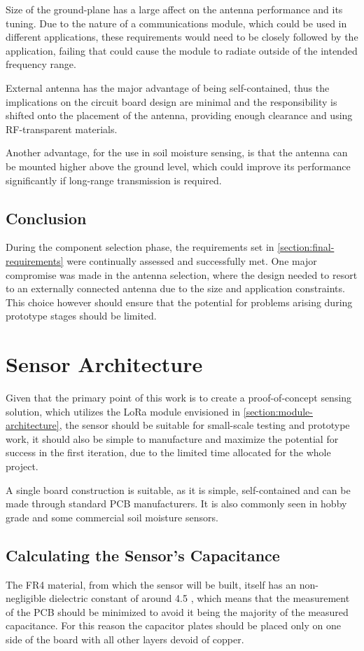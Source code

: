 Size of the ground-plane has a large affect on the antenna performance and its tuning. Due to the nature of a communications module, which could be used in different applications, these requirements would need to be closely followed by the application, failing that could cause the module to radiate outside of the intended frequency range.

External antenna has the major advantage of being self-contained, thus the implications on the circuit board design are minimal and the responsibility is shifted onto the placement of the antenna, providing enough clearance and using RF-transparent materials.

Another advantage, for the use in soil moisture sensing, is that the antenna can be mounted higher above the ground level, which could improve its performance significantly if long-range transmission is required.

\subsection{Conclusion}
During the component selection phase, the requirements set in \ref{section:final-requirements} were continually assessed and successfully met. One major compromise was made in the antenna selection, where the design needed to resort to an externally connected antenna due to the size and application constraints. This choice however should ensure that the potential for problems arising during prototype stages should be limited.

\FloatBarrier
\section{Sensor Architecture}
Given that the primary point of this work is to create a proof-of-concept sensing solution, which utilizes the LoRa module envisioned in \ref{section:module-architecture}, the sensor should be suitable for small-scale testing and prototype work, it should also be simple to manufacture and maximize the potential for success in the first iteration, due to the limited time allocated for the whole project.

A single board construction is suitable, as it is simple, self-contained and can be made through standard PCB manufacturers. It is also commonly seen in hobby grade and some commercial soil moisture sensors.

\subsection{\label{section:expected-cap}Calculating the Sensor's Capacitance}
The FR4 material, from which the sensor will be built, itself has an non-negligible dielectric constant of around 4.5 \cite{pcbway_stackup_2024}, which means that the measurement of the PCB should be minimized to avoid it being the majority of the measured capacitance. For this reason the capacitor plates should be placed only on one side of the board with all other layers devoid of copper.

